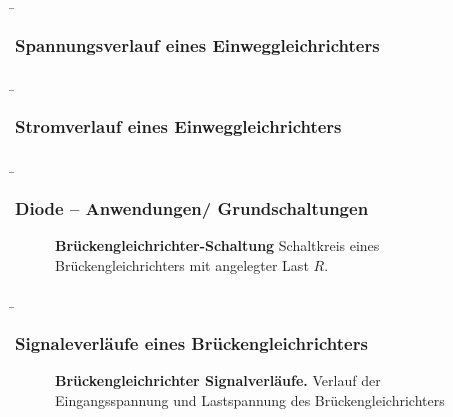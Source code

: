 \begin{frame}
    \b{ \frametitle{Spannungsverlauf eines Einweggleichrichters}
        \begin{figure}[H]

            \centering
                 

        \end{figure}
    }   

\end{frame}

\begin{frame}
    \b{ \frametitle{ Stromverlauf eines Einweggleichrichters}
    
    \begin{figure}
        \centering
        
    \end{figure}
    }
\end{frame}


\begin{frame}
    \b{ \frametitle{Diode -- Anwendungen/ Grundschaltungen}
        \begin{figure}[H]
            \centering
            
            \label{fig:BrueckengleichrichterSchaltungFolie}
            \caption{\textbf{Brückengleichrichter-Schaltung} Schaltkreis eines Brückengleichrichters mit angelegter Last $R$.} 
        \end{figure}
    }   
\end{frame}

\begin{frame}
    \b{ \frametitle{Signaleverläufe eines Brückengleichrichters}
        \begin{figure}[H]
            \centering
            
            \caption{\textbf{Brückengleichrichter Signalverläufe.} Verlauf der Eingangsspannung und Lastspannung des 
            Brückengleichrichters }  
            \label{fig:BrueckengleichrichterSignalverlaeufeFolie}
        \end{figure}
    }
\end{frame}

